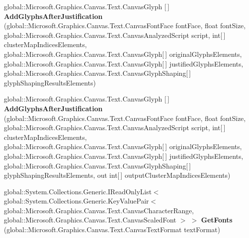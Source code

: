 \begin{DoxyCompactItemize}
\item 
\mbox{\label{interface_microsoft_1_1_graphics_1_1_canvas_1_1_text_1_1_i_canvas_text_analyzer_a2273cc0297471b8040a1ceb61d9fc6ba}} 
global\+::\+Microsoft.\+Graphics.\+Canvas.\+Text.\+Canvas\+Glyph \mbox{[}$\,$\mbox{]} {\bfseries Add\+Glyphs\+After\+Justification} (global\+::\+Microsoft.\+Graphics.\+Canvas.\+Text.\+Canvas\+Font\+Face font\+Face, float font\+Size, global\+::\+Microsoft.\+Graphics.\+Canvas.\+Text.\+Canvas\+Analyzed\+Script script, int\mbox{[}$\,$\mbox{]} cluster\+Map\+Indices\+Elements, global\+::\+Microsoft.\+Graphics.\+Canvas.\+Text.\+Canvas\+Glyph\mbox{[}$\,$\mbox{]} original\+Glyphs\+Elements, global\+::\+Microsoft.\+Graphics.\+Canvas.\+Text.\+Canvas\+Glyph\mbox{[}$\,$\mbox{]} justified\+Glyphs\+Elements, global\+::\+Microsoft.\+Graphics.\+Canvas.\+Text.\+Canvas\+Glyph\+Shaping\mbox{[}$\,$\mbox{]} glyph\+Shaping\+Results\+Elements)
\item 
\mbox{\label{interface_microsoft_1_1_graphics_1_1_canvas_1_1_text_1_1_i_canvas_text_analyzer_a9d0678a1c679966f39ef4b914bbc869a}} 
global\+::\+Microsoft.\+Graphics.\+Canvas.\+Text.\+Canvas\+Glyph \mbox{[}$\,$\mbox{]} {\bfseries Add\+Glyphs\+After\+Justification} (global\+::\+Microsoft.\+Graphics.\+Canvas.\+Text.\+Canvas\+Font\+Face font\+Face, float font\+Size, global\+::\+Microsoft.\+Graphics.\+Canvas.\+Text.\+Canvas\+Analyzed\+Script script, int\mbox{[}$\,$\mbox{]} cluster\+Map\+Indices\+Elements, global\+::\+Microsoft.\+Graphics.\+Canvas.\+Text.\+Canvas\+Glyph\mbox{[}$\,$\mbox{]} original\+Glyphs\+Elements, global\+::\+Microsoft.\+Graphics.\+Canvas.\+Text.\+Canvas\+Glyph\mbox{[}$\,$\mbox{]} justified\+Glyphs\+Elements, global\+::\+Microsoft.\+Graphics.\+Canvas.\+Text.\+Canvas\+Glyph\+Shaping\mbox{[}$\,$\mbox{]} glyph\+Shaping\+Results\+Elements, out int\mbox{[}$\,$\mbox{]} output\+Cluster\+Map\+Indices\+Elements)
\item 
\mbox{\label{interface_microsoft_1_1_graphics_1_1_canvas_1_1_text_1_1_i_canvas_text_analyzer_aeef37c4db68a938f3d62ba8dbfaeed81}} 
global\+::\+System.\+Collections.\+Generic.\+I\+Read\+Only\+List$<$ global\+::\+System.\+Collections.\+Generic.\+Key\+Value\+Pair$<$ global\+::\+Microsoft.\+Graphics.\+Canvas.\+Text.\+Canvas\+Character\+Range, global\+::\+Microsoft.\+Graphics.\+Canvas.\+Text.\+Canvas\+Scaled\+Font $>$ $>$ {\bfseries Get\+Fonts} (global\+::\+Microsoft.\+Graphics.\+Canvas.\+Text.\+Canvas\+Text\+Format text\+Format)

\end{DoxyCompactItemize}
